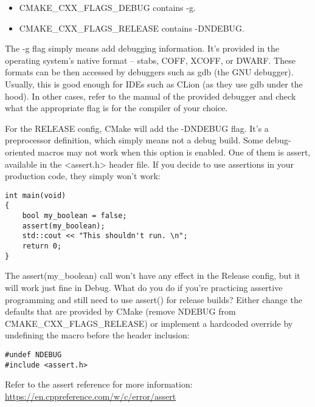 \begin{itemize}
\item 
CMAKE\_CXX\_FLAGS\_DEBUG contains -g.

\item 
CMAKE\_CXX\_FLAGS\_RELEASE contains -DNDEBUG.
\end{itemize}

The -g flag simply means add debugging information. It's provided in the operating system's native format – stabs, COFF, XCOFF, or DWARF. These formats can be then accessed by debuggers such as gdb (the GNU debugger). Usually, this is good enough for IDEs such as CLion (as they use gdb under the hood). In other cases, refer to the manual of the provided debugger and check what the appropriate flag is for the compiler of your choice.

For the RELEASE config, CMake will add the -DNDEBUG flag. It's a preprocessor definition, which simply means not a debug build. Some debug-oriented macros may not work when this option is enabled. One of them is assert, available in the <assert.h> header file. If you decide to use assertions in your production code, they simply won't work:

\begin{lstlisting}[style=styleCXX]
int main(void)
{
	bool my_boolean = false;
	assert(my_boolean);
	std::cout << "This shouldn't run. \n";
	return 0;
}
\end{lstlisting}

The assert(my\_boolean) call won't have any effect in the Release config, but it will work just fine in Debug. What do you do if you're practicing assertive programming and still need to use assert() for release builds? Either change the defaults that are provided by CMake (remove NDEBUG from CMAKE\_CXX\_FLAGS\_RELEASE) or implement a hardcoded override by undefining the macro before the header inclusion:

\begin{lstlisting}[style=styleCXX]
#undef NDEBUG
#include <assert.h>
\end{lstlisting}

Refer to the assert reference for more information: \url{https://en.cppreference.com/w/c/error/assert}
